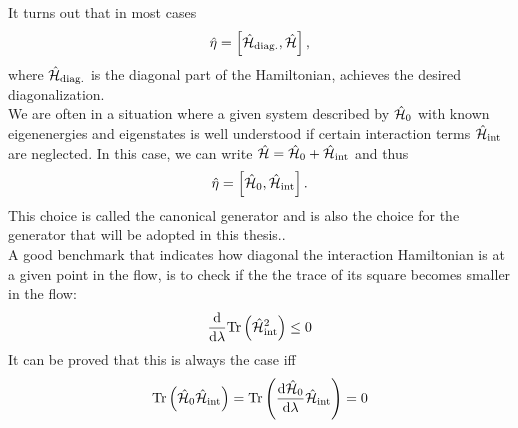 It turns out that in most cases 
\begin{equation}\label{FEQ_eta_def}
\hat\eta = \left[\hat{\mathcal{H}}_{\mathrm{diag.}},\hat{\mathcal{H}} \right],
\end{equation}
where $\hat{\mathcal{H}}_{\mathrm{diag.}}$ is the diagonal part of the Hamiltonian, achieves the desired diagonalization.  \\
We are often in a situation where a given system described by $\hat{\mathcal{H}}_0$ with known eigenenergies  and eigenstates is well understood if certain interaction terms $\hat{\mathcal{H}}_{\mathrm{int}}$ are neglected. In this case, we can write $\hat{\mathcal{H}} = \hat{\mathcal{H}}_0 + \hat{\mathcal{H}}_{\mathrm{int}}$ and thus
\begin{equation}\label{FEQ_can_eta_def}
\hat\eta = \left[\hat{\mathcal{H}}_0, \hat{\mathcal{H}}_{\mathrm{int}}\right].
\end{equation}
This choice is called the canonical generator and is also the choice for the generator that will be adopted in this thesis.. \\
A good benchmark that indicates how diagonal the interaction Hamiltonian is at a given point in the flow, is to check if the the trace of its square becomes smaller in the flow:
\begin{equation}\label{check_trace}
\frac{\mathrm d}{\mathrm d \lambda}\mathrm{Tr}\left(\hat{\mathcal{H}}^2_{\mathrm{int}}\right)\leq 0
\end{equation}
It can be proved \cite[pp. 27-28]{kehrein2006flow} that this is always the case iff 
\begin{align}\label{useless_check}
\mathrm{Tr}\left(\hat{\mathcal{H}}_0\hat{\mathcal{H}}_{\mathrm{int}}\right)=\mathrm{Tr}\left(\frac{\mathrm d\hat{\mathcal{H}}_0}{\mathrm d\lambda} \hat{\mathcal{H}}_{\mathrm{int}}\right)=0
\end{align}
